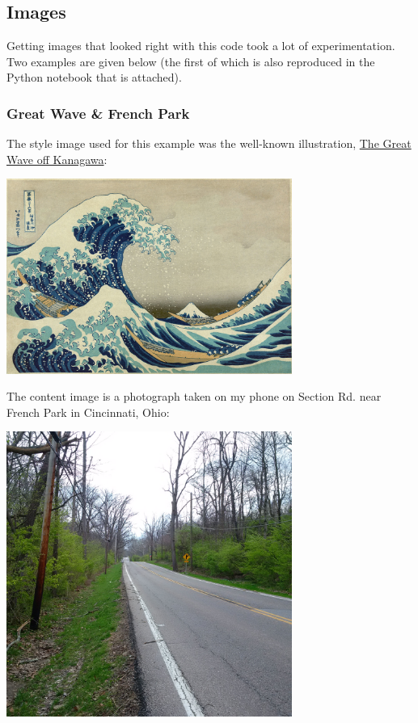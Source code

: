 \documentclass{article}
\begin{document}


\subsection{Images}

Getting images that looked right with this code took a lot of
experimentation. Two examples are given below (the first of which is
also reproduced in the Python notebook that is attached).

\subsubsection{Great Wave \& French Park}

The style image used for this example was the well-known illustration,
\href{https://en.wikipedia.org/wiki/The_Great_Wave_off_Kanagawa}{The
  Great Wave off Kanagawa}:

\includegraphics[width=0.7\textwidth]{./1280px-Great_Wave_off_Kanagawa2b.jpg}

The content image is a photograph taken on my phone on Section
Rd. near French Park in Cincinnati, Ohio:

\includegraphics[width=0.7\textwidth]{./french_park.jpg}
\end{document}
